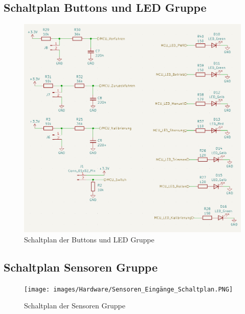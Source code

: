 \subsection{Schaltplan Buttons und LED Gruppe}
\begin{figure}[H]
	\centering
	\includegraphics[width=1.0\textwidth]{images/Hardware/LEDS_und_buttons_schaltplan.PNG}
	\caption{Schaltplan der Buttons und LED Gruppe}
	\label{fig:ButtonGruppe}
\end{figure}
\subsection{Schaltplan Sensoren Gruppe}
\begin{figure}[H]
	\centering
	\texttt{[image: images/Hardware/Sensoren\_Eingänge\_Schaltplan.PNG]}
	\caption{Schaltplan der Sensoren Gruppe}
	\label{fig:SensorenGruppe}
\end{figure}
